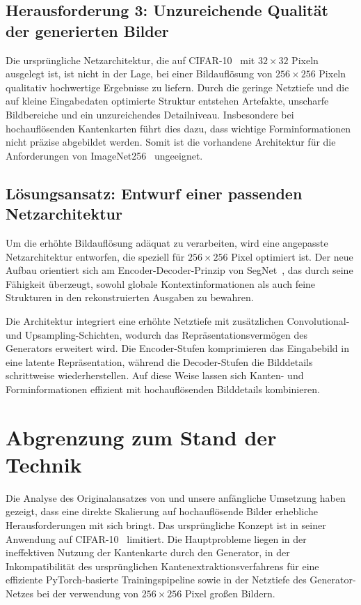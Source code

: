 \subsection{Herausforderung 3: Unzureichende Qualität der generierten Bilder}
Die ursprüngliche Netzarchitektur, die auf CIFAR-10~\cite{krizhevsky2009learning} mit $32 \times 32$ Pixeln ausgelegt ist, ist nicht in der Lage, bei einer Bildauflösung von $256 \times 256$ Pixeln qualitativ hochwertige Ergebnisse zu liefern. Durch die geringe Netztiefe und die auf kleine Eingabedaten optimierte Struktur entstehen Artefakte, unscharfe Bildbereiche und ein unzureichendes Detailniveau. Insbesondere bei hochauflösenden Kantenkarten führt dies dazu, dass wichtige Forminformationen nicht präzise abgebildet werden. Somit ist die vorhandene Architektur für die Anforderungen von ImageNet256~\cite{Uriot2023imageNet} ungeeignet. 




\subsection{Lösungsansatz: Entwurf einer passenden Netzarchitektur}
Um die erhöhte Bildauflösung adäquat zu verarbeiten, wird eine angepasste Netzarchitektur entworfen, die speziell für $256 \times 256$ Pixel optimiert ist. Der neue Aufbau orientiert sich am Encoder-Decoder-Prinzip von SegNet~\cite{badrinarayanan2017segnet}, das durch seine Fähigkeit überzeugt, sowohl globale Kontextinformationen als auch feine Strukturen in den rekonstruierten Ausgaben zu bewahren. 

Die Architektur integriert eine erhöhte Netztiefe mit zusätzlichen Convolutional- und Upsampling-Schichten, wodurch das Repräsentationsvermögen des Generators erweitert wird. Die Encoder-Stufen komprimieren das Eingabebild in eine latente Repräsentation, während die Decoder-Stufen die Bilddetails schrittweise wiederherstellen. Auf diese Weise lassen sich Kanten- und Forminformationen effizient mit hochauflösenden Bilddetails kombinieren. 





\section{Abgrenzung zum Stand der Technik}
\label{sec:AbgrenzungZumStandDerTechnik}
Die Analyse des Originalansatzes von \textcite{He_2023_ICCV} und unsere anfängliche Umsetzung haben gezeigt, dass eine direkte Skalierung auf hochauflösende Bilder erhebliche Herausforderungen mit sich bringt. Das ursprüngliche Konzept ist in seiner Anwendung auf CIFAR-10~\cite{krizhevsky2009learning} limitiert. Die Hauptprobleme liegen in der ineffektiven Nutzung der Kantenkarte durch den Generator, in der Inkompatibilität des ursprünglichen Kantenextraktionsverfahrens für eine effiziente PyTorch-basierte Trainingspipeline sowie in der Netztiefe des Generator-Netzes bei der verwendung von $256 \times 256$ Pixel großen Bildern.


